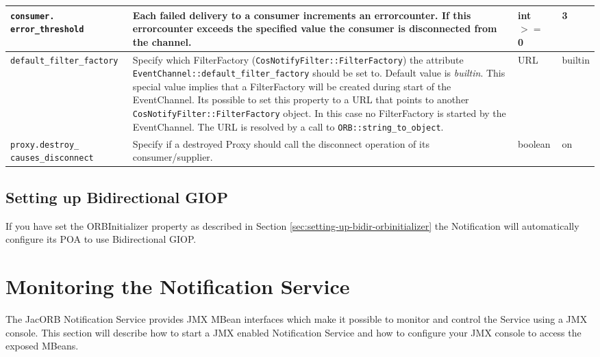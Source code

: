 \begin{small}
\begin{longtable}{|p{5cm}|p{7.5cm}|p{1.5cm}|p{1.5cm}|}
    \verb"consumer."
    \verb"error_threshold" &

    Each failed delivery to a consumer increments an errorcounter. If this
    errorcounter exceeds the specified value the consumer is
    disconnected from the channel. &

    int $>=$ 0 & 3 \\ \hline

    \verb"default_filter_factory" &

    Specify which FilterFactory (\texttt{CosNotifyFilter::FilterFactory}) the
    attribute \texttt{EventChannel::\-default\_filter\_factory} should be set to. 
    Default value is \emph{builtin}. This special value implies that a
    FilterFactory will be created during start of the EventChannel.
    Its possible to set this property to a URL that points to another
    \texttt{CosNotifyFilter::FilterFactory} object. In this case no FilterFactory
    is started by the EventChannel. The URL is resolved by a call
    to \texttt{ORB::string\_to\_object}. &

    URL & builtin \\ \hline

    \verb"proxy.destroy_"
    \verb"causes_disconnect" &

    Specify if a destroyed Proxy should call the disconnect operation
    of its consumer/supplier. &

    boolean & on \\ \hline
  \end{longtable}
\end{small}

\subsection{Setting up Bidirectional GIOP}

If you have set the ORBInitializer property as described in Section \ref{sec:setting-up-bidir-orbinitializer} 
the Notification will automatically configure its POA to use Bidirectional GIOP.

\section{Monitoring the Notification Service}
\label{sec:ntfy-monitoring}

The JacORB Notification Service provides JMX MBean interfaces which make it possible to monitor and control the Service using a JMX console. This section will describe how to start a JMX enabled Notification Service and how to configure your JMX console to access the exposed MBeans.

